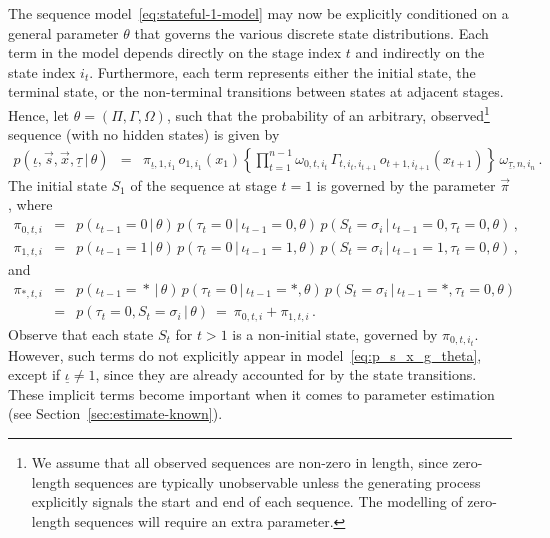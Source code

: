 \documentclass[a4paper]{article}
\begin{document}
The sequence model~\eqref{eq:stateful-1-model}
may now be explicitly conditioned on a general parameter $\theta$
that governs the various discrete state distributions. Each term in the model depends directly on the stage index $t$ and 
indirectly on the state index $i_t$. 
Furthermore, each term represents either the initial state, the terminal state, or the non-terminal transitions
between states at adjacent stages. Hence, let $\theta=(\Pi,\Gamma,\Omega)$, 
such that the probability of an arbitrary, observed\footnote{We assume that all observed sequences are non-zero in length,
since zero-length sequences are typically unobservable unless the generating process explicitly signals the start
and end of each sequence. The modelling of zero-length sequences will require an extra parameter.} sequence (with no hidden states) is given by
\begin{eqnarray}
p(\underline{\iota},\vec{s},\vec{x},\underline{\tau}\,|\,\theta) & = & \pi_{\underline{\iota},1,i_1}\,o_{1,i_1}(x_1)\left\{\prod_{t=1}^{n-1}\omega_{0,t,i_t}\,\Gamma_{t,i_t,i_{t+1}}\,o_{t+1,i_{t+1}}(x_{t+1})
\right\}\,\omega_{\underline{\tau},n,i_n}
\,.
\label{eq:p_s_x_g_theta}
\end{eqnarray}
The initial state $S_1$ of the sequence at stage $t=1$ is governed by the parameter $\vec{\pi}$, where
\begin{eqnarray}
  \pi_{0,t,i} & = & p(\iota_{t-1}\!=\!0\,|\,\theta)\,p(\tau_t\!=\!0\,|\,\iota_{t-1}\!=\!0,\theta)
      \,p(S_t\!=\!\sigma_{i}\,|\,\iota_{t-1}\!=\!0,\tau_t\!=\!0,\theta)\,,
\\
  \pi_{1,t,i} & = & p(\iota_{t-1}\!=\!1\,|\,\theta)\,p(\tau_t\!=\!0\,|\,\iota_{t-1}\!=\!1,\theta)
      \,p(S_t\!=\!\sigma_{i}\,|\,\iota_{t-1}\!=\!1,\tau_t\!=\!0,\theta)\,,
\end{eqnarray}
and
\begin{eqnarray}
  \pi_{*,t,i} & = & p(\iota_{t-1}\!=\!*\,|\,\theta)\,p(\tau_t\!=\!0\,|\,\iota_{t-1}\!=\!*,\theta)
      \,p(S_t\!=\!\sigma_{i}\,|\,\iota_{t-1}\!=\!*,\tau_t\!=\!0,\theta)
\nonumber\\& = &
  p(\tau_t\!=\!0,S_t\!=\!\sigma_i\,|\,\theta)~=~\pi_{0,t,i}+\pi_{1,t,i}\,.
\label{eq:pi:*}
\end{eqnarray}
Observe that each state $S_t$ for $t>1$ is a non-initial state, governed by $\pi_{0,t,i_t}$. However, such terms do
not explicitly appear in model~\eqref{eq:p_s_x_g_theta}, except if $\underline{\iota}\ne 1$, 
since they are already accounted for by the state transitions.
These implicit terms become important when it comes to parameter estimation (see Section~\ref{sec:estimate-known}).
\end{document}
